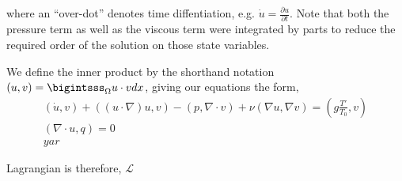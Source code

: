 \documentclass{article}
\begin{document}
where an ``over-dot'' denotes time diffentiation, e.g. $\dot u =
\frac{\partial u}{\partial t}$. Note that both the pressure term as well
as the viscous term were integrated by parts to reduce the required
order of the solution on those state variables.  

We define the inner product by the shorthand notation $(u,v) =
\bigintsss_\Omega u\cdot v dx $, giving our equations the form,  
\begin{align}
 (\dot u,v) + ((u \cdot \nabla) u, v) - (p,\nabla \cdot v) + \nu (\nabla
 u, \nabla v) = (g \frac{T'}{T_0},v) \\
 (\nabla \cdot u, q) = 0 \\
 yar
\end{align}


Lagrangian is therefore,
$\mathcal{L}$
\end{document}
